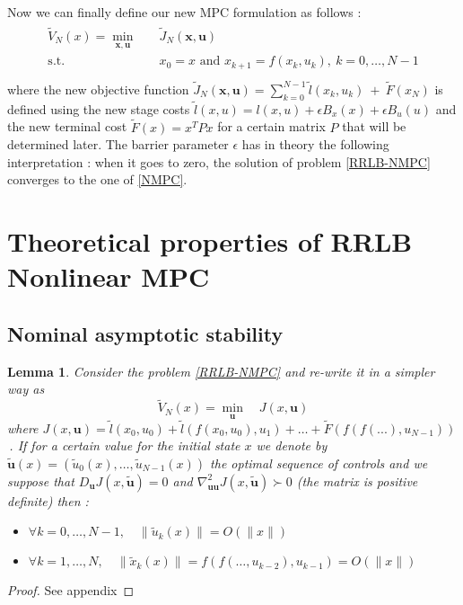 \documentclass[12pt]{article}
\newtheorem{lemma}[theorem]{Lemma}
\theoremstyle{definition}
\theoremstyle{remark}
\begin{document}
\newpage
Now we can finally define our new MPC formulation as follows :
\begin{align}
	\begin{split}\label{RRLB-NMPC}
		\tilde{V}_N(x)=\underset{\mathbf{x},\mathbf{u}}{\min} &\quad \tilde{J}_N(\mathbf{x},\mathbf{u})\\
		\text{s.t.} &\quad x_0=x\text{ and }x_{k+1}=f(x_k,u_k),~k=0,\dots,N-1\\
	\end{split}
\end{align}
where the new objective function $\tilde{J}_N(\mathbf{x},\mathbf{u})=\sum_{k=0}^{N-1}\tilde{l}(x_k,u_k)~+~\tilde{F}(x_N)$ is defined using the new stage costs $\tilde{l}(x,u)=l(x,u)+\epsilon B_x(x)+\epsilon B_u(u)$ and the new terminal cost $\tilde{F}(x)=x^TPx$ for a certain matrix $P$ that will be determined later.
The barrier parameter $\epsilon$ has in theory the following interpretation : when it goes to zero, the solution of problem \ref{RRLB-NMPC} converges to the one of \ref{NMPC}.


\section{Theoretical properties of RRLB Nonlinear MPC}

\subsection{Nominal asymptotic stability}

\begin{lemma}
	\label{Lipchitzianity}
	Consider the problem \ref{RRLB-NMPC} and re-write it in a simpler way as 
	$$\tilde{V}_N(x)=\underset{\mathbf{u}}{\min} \quad J(x,\mathbf{u})$$
	where $J(x,\mathbf{u})=\tilde{l}(x_0,u_0)+\tilde{l}(f(x_0,u_0),u_1)+\dots+\tilde{F}(f(f(...),u_{N-1}))$\,.
	If for a certain value for the initial state $x$ we denote by $\tilde{\mathbf{u}}(x)=(\tilde{u}_0(x),\dots,\tilde{u}_{N-1}(x))$ the optimal sequence of controls and we suppose that $D_\mathbf{u}J(x,\tilde{\mathbf{u}})=0$ and $\nabla_{\mathbf{u}\mathbf{u}}^2J(x, \tilde{\mathbf{u}})\succ 0$ (the matrix is positive definite) then :
	\begin{itemize}[label=\textbullet]
		\item $\forall k=0,\dots,N-1,\quad \|\tilde{u}_k(x)\|=O(\|x\|)$
		\item $\forall k=1,\dots,N,\quad \|\tilde{x}_k(x)\|=f(f(\dots,u_{k-2}),u_{k-1})=O(\|x\|)$
	\end{itemize}
\end{lemma}
\begin{proof}
	See appendix
\end{proof}
\end{document}
